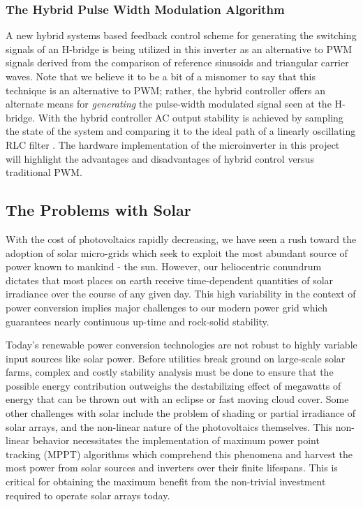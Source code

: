 \subsubsection{The Hybrid Pulse Width Modulation Algorithm}
A new hybrid systems based feedback control scheme for generating the switching signals of an H-bridge is being utilized in this inverter as an alternative to PWM signals derived from the comparison of reference sinusoids and triangular carrier waves. Note that we believe it to be a bit of a misnomer to say that this technique is an alternative to PWM; rather, the hybrid controller offers an alternate means for \emph{generating} the pulse-width modulated signal seen at the H-bridge. 
With the hybrid controller AC output stability is achieved by sampling the state of the system and comparing it to the ideal path of a linearly oscillating RLC filter \cite{ricardo}. The hardware implementation of the microinverter in this project will highlight the advantages and disadvantages of hybrid control versus traditional PWM.

\subsection{The Problems with Solar}
With the cost of photovoltaics rapidly decreasing, we have seen a rush toward the adoption of solar micro-grids which seek to exploit the most abundant source of power known to mankind - the sun. However, our heliocentric conundrum dictates that most places on earth receive time-dependent quantities of solar irradiance over the course of any given day. This high variability in the context of power conversion implies major challenges to our modern power grid which guarantees nearly continuous up-time and rock-solid stability. 

Today's renewable power conversion technologies are not robust to highly variable input sources like solar power. Before utilities break ground on large-scale solar farms, complex and costly stability analysis must be done to ensure that the possible energy contribution outweighs the destabilizing effect of megawatts of energy that can be thrown out with an eclipse or fast moving cloud cover. Some other challenges with solar include  the problem of shading or partial irradiance of solar arrays, and the non-linear nature of the photovoltaics themselves. This non-linear behavior necessitates the implementation of maximum power point tracking (MPPT) algorithms which comprehend this phenomena and harvest the most power from solar sources and inverters over their finite lifespans. This is critical for obtaining the maximum benefit from the non-trivial investment required to operate solar arrays today. 

